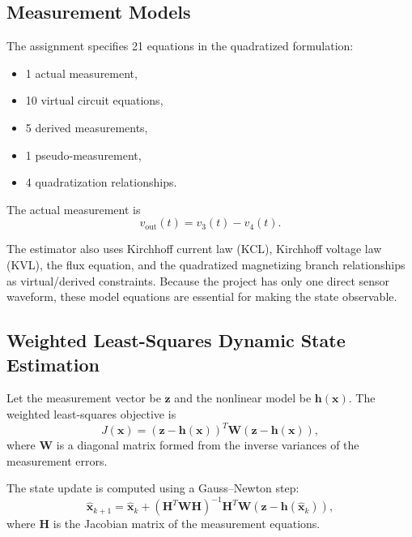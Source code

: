 \documentclass[11pt]{article}
\begin{document}
\subsection{Measurement Models}
The assignment specifies 21 equations in the quadratized formulation:
\begin{itemize}
  \item 1 actual measurement,
  \item 10 virtual circuit equations,
  \item 5 derived measurements,
  \item 1 pseudo-measurement,
  \item 4 quadratization relationships.
\end{itemize}

The actual measurement is
\begin{equation}
v_{\text{out}}(t) = v_3(t) - v_4(t).
\end{equation}

The estimator also uses Kirchhoff current law (KCL), Kirchhoff voltage law (KVL), the flux
equation, and the quadratized magnetizing branch relationships as virtual/derived constraints.
Because the project has only one direct sensor waveform, these model equations are essential for
making the state observable.

\subsection{Weighted Least-Squares Dynamic State Estimation}
Let the measurement vector be $\mathbf{z}$ and the nonlinear model be $\mathbf{h}(\mathbf{x})$.
The weighted least-squares objective is
\begin{equation}
J(\mathbf{x}) = \left( \mathbf{z} - \mathbf{h}(\mathbf{x}) \right)^T
\mathbf{W}
\left( \mathbf{z} - \mathbf{h}(\mathbf{x}) \right),
\end{equation}
where $\mathbf{W}$ is a diagonal matrix formed from the inverse variances of the measurement
errors.

The state update is computed using a Gauss--Newton step:
\begin{equation}
\hat{\mathbf{x}}_{k+1}
=
\hat{\mathbf{x}}_{k}
+
\left( \mathbf{H}^{T}\mathbf{W}\mathbf{H} \right)^{-1}
\mathbf{H}^{T}\mathbf{W}
\left( \mathbf{z} - \mathbf{h}(\hat{\mathbf{x}}_{k}) \right),
\end{equation}
where $\mathbf{H}$ is the Jacobian matrix of the measurement equations.
\end{document}
